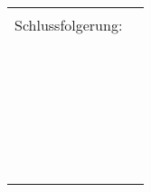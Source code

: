 \documentclass[10pt,a4paper,fleqn]{article}
\begin{document}
	\renewcommand{\arraystretch}{1.2}
	\begin{tabularx}{\textwidth}{r X}
		\large{Schlussfolgerung:} & \hrule\\
		& \hrule\\
		& \hrule\\
		& \hrule\\
		& \hrule\\
	\end{tabularx}	
	
\end{document}
